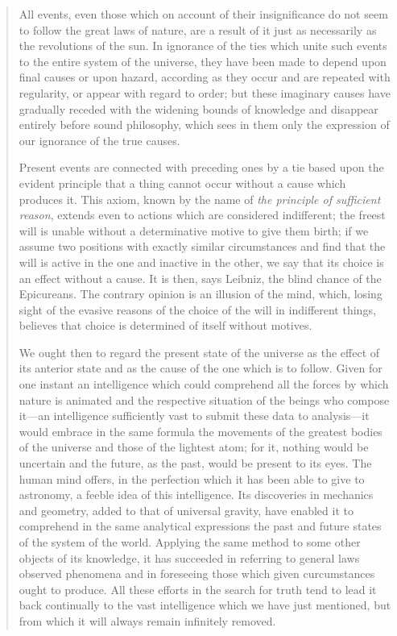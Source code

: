 \begin{quotation}
All events, even those which on account of their insignificance do not seem to follow the great laws of nature, are a result of it just as necessarily as the revolutions of the sun. In ignorance of the ties which unite such events to the entire system of the universe, they have been made to depend upon final causes or upon hazard, according as they occur and are repeated with regularity, or appear with regard to order; but these imaginary causes have gradually receded with the widening bounds of knowledge and disappear entirely before sound philosophy, which sees in them only the expression of our ignorance of the true causes.

Present events are connected with preceding ones by a tie based upon the evident principle that a thing cannot occur without a cause which produces it. This axiom, known by the name of \textit{the principle of sufficient reason}, extends even to actions which are considered indifferent; the freest will is unable without a determinative motive to give them birth; if we assume two positions with exactly similar circumstances and find that the will is active in the one and inactive in the other, we say that its choice is an effect without a cause. It is then, says Leibniz, the blind chance of the Epicureans. The contrary opinion is an illusion of the mind, which, losing sight of the evasive reasons of the choice of the will in indifferent things, believes that choice is determined of itself without motives.

We ought then to regard the present state of the universe as the effect of its anterior state and as the cause of the one which is to follow. Given for one instant an intelligence which could comprehend all the forces by which nature is animated and the respective situation of the beings who compose it---an intelligence sufficiently vast to submit these data to analysis---it would embrace in the same formula the movements of the greatest bodies of the universe and those of the lightest atom; for it, nothing would be uncertain and the future, as the past, would be present to its eyes. The human mind offers, in the perfection which it has been able to give to astronomy, a feeble idea of this intelligence. Its discoveries in mechanics and geometry, added to that of universal gravity, have enabled it to comprehend in the same analytical expressions the past and future states of the system of the world. Applying the same method to some other objects of its knowledge, it has succeeded in referring to general laws observed phenomena and in foreseeing those which given curcumstances ought to produce. All these efforts in the search for truth tend to lead it back continually to the vast intelligence which we have just mentioned, but from which it will always remain infinitely removed.
\end{quotation}

